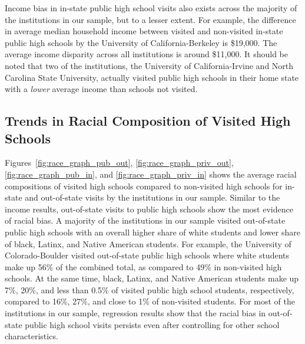 \documentclass{article}
\begin{document}
Income bias in in-state public high school visits also exists across the majority of the institutions in our sample, but to a lesser extent. For example, the difference in average median household income between visited and non-visited in-state public high schools by the University of California-Berkeley is \$19,000. The average income disparity across all institutions is around \$11,000. It should be noted that two of the institutions, the University of California-Irvine and North Carolina State University, actually visited public high schools in their home state with a \textit{lower} average income than schools not visited.

\subsection*{Trends in Racial Composition of Visited High Schools}

Figures~\ref{fig:race_graph_pub_out}, \ref{fig:race_graph_priv_out}, \ref{fig:race_graph_pub_in}, and \ref{fig:race_graph_priv_in} shows the average racial compositions of visited high schools compared to non-visited high schools for in-state and out-of-state visits by the institutions in our sample. Similar to the income results, out-of-state visits to public high schools show the most evidence of racial bias. A majority of the institutions in our sample visited out-of-state public high schools with an overall higher share of white students and lower share of black, Latinx, and Native American students. For example, the University of Colorado-Boulder visited out-of-state public high schools where white students make up 56\% of the combined total, as compared to 49\% in non-visited high schools. At the same time, black, Latinx, and Native American students make up 7\%, 20\%, and less than 0.5\% of visited public high school students, respectively, compared to 16\%, 27\%, and close to 1\% of non-visited students. For most of the institutions in our sample, regression results show that the racial bias in out-of-state public high school visits persists even after controlling for other school characteristics.
\end{document}
